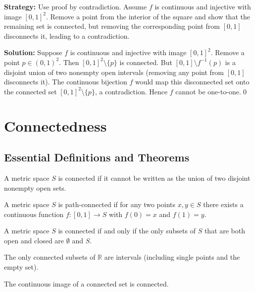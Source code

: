 \noindent\textbf{Strategy:} Use proof by contradiction. Assume $f$ is continuous and injective with image $[0,1]^2$. Remove a point from the interior of the square and show that the remaining set is connected, but removing the corresponding point from $[0,1]$ disconnects it, leading to a contradiction.

\bigskip\noindent\textbf{Solution:}
Suppose $f$ is continuous and injective with image $[0,1]^2$. Remove a point $p\in(0,1)^2$. Then $[0,1]^2\setminus\{p\}$ is connected. But $[0,1]\setminus f^{-1}(p)$ is a disjoint union of two nonempty open intervals (removing any point from $[0,1]$ disconnects it). The continuous bijection $f$ would map this disconnected set onto the connected set $[0,1]^2\setminus\{p\}$, a contradiction. Hence $f$ cannot be one-to-one.\qed

\section{Connectedness}

\subsection*{Essential Definitions and Theorems}

\begin{definition}
A metric space $S$ is connected if it cannot be written as the union of two disjoint nonempty open sets.
\end{definition}

\begin{definition}
A metric space $S$ is path-connected if for any two points $x,y \in S$ there exists a continuous function $f: [0,1] \to S$ with $f(0) = x$ and $f(1) = y$.
\end{definition}

\begin{theorem}
A metric space $S$ is connected if and only if the only subsets of $S$ that are both open and closed are $\emptyset$ and $S$.
\end{theorem}

\begin{theorem}
The only connected subsets of $\mathbb{R}$ are intervals (including single points and the empty set).
\end{theorem}

\begin{theorem}
The continuous image of a connected set is connected.
\end{theorem}

